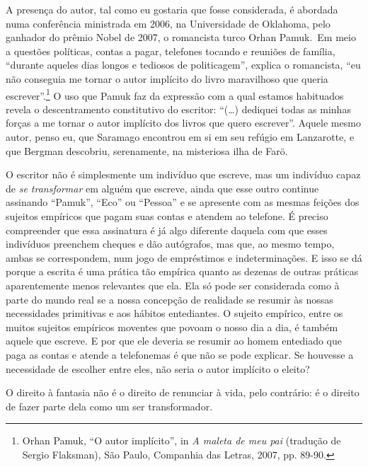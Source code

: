 A presença do autor, tal como eu gostaria que fosse considerada, é
abordada numa conferência ministrada em 2006, na Universidade de
Oklahoma, pelo ganhador do prêmio Nobel de 2007, o romancista turco
Orhan Pamuk.~Em meio a questões políticas, contas a pagar, telefones
tocando e reuniões de família, ``durante aqueles dias longos e tediosos
de politicagem'', explica o romancista, ``eu não conseguia me tornar o
autor implícito do livro maravilhoso que queria escrever''.\footnote{Orhan
  Pamuk, ``O autor implícito'', in \emph{A maleta de meu pai} (tradução
  de Sergio Flaksman), São Paulo, Companhia das Letras, 2007, pp. 89-90.}
O uso que Pamuk faz da expressão com a qual estamos habituados revela o
descentramento constitutivo do escritor: ``(\ldots{}) dediquei todas as
minhas forças a me tornar o autor implícito dos livros que quero
escrever''. Aquele mesmo autor, penso eu, que Saramago encontrou em si
em seu refúgio em Lanzarotte, e que Bergman descobriu, serenamente, na
misteriosa ilha de Farö.

O escritor não é simplesmente um indivíduo que escreve, mas um indivíduo
capaz de \emph{se transformar} em alguém que escreve, ainda que
esse outro continue assinando ``Pamuk'', ``Eco'' ou ``Pessoa'' e se apresente com as mesmas feições dos sujeitos empíricos que pagam suas contas e atendem ao
telefone. É preciso compreender que essa assinatura é já algo diferente
daquela com que esses indivíduos preenchem cheques e dão autógrafos, mas
que, ao mesmo tempo, ambas se correspondem, num jogo de empréstimos e
indeterminações. E isso se dá porque a escrita é uma prática tão
empírica quanto as dezenas de outras práticas aparentemente menos
relevantes que ela. Ela só pode ser considerada como à parte do mundo
real se a nossa concepção de realidade se resumir às nossas
necessidades primitivas e aos hábitos entediantes. O sujeito empírico,
entre os muitos sujeitos empíricos moventes que povoam o nosso dia a
dia, é também aquele que escreve. E por que ele deveria se resumir ao
homem entediado que paga as contas e atende a telefonemas é que não se
pode explicar. Se houvesse a necessidade de escolher entre eles, não
seria o autor implícito o eleito?

O direito à fantasia não é o direito de renunciar à vida, pelo
contrário: é o direito de fazer parte dela como um ser transformador.

